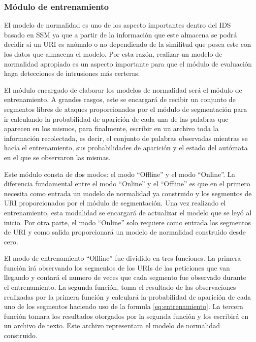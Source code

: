 \subsubsection{Módulo de entrenamiento}\label{sec:entrenamiento}

El modelo de normalidad es uno de los aspecto importantes dentro del IDS basado en SSM ya que a partir de la información que este almacena se podrá decidir si un URI es anómalo o no dependiendo de la similitud que posea este con los datos que almacena el modelo. Por esta razón, realizar un modelo de normalidad apropiado es un aspecto  importante para que el módulo de evaluación haga detecciones de intrusiones más certeras.

El módulo encargado de elaborar los modelos de normalidad será el módulo de entrenamiento. A grandes rasgos, este se encargará de recibir un conjunto de segmentos libres de ataques proporcionados por el módulo de segmentación para ir calculando la probabilidad de aparición de cada una de las palabras que aparecen en los mismos, para finalmente, escribir en un archivo toda la información recolectada, es decir, el conjunto de palabras observadas mientras se hacía el entrenamiento, sus probabilidades de aparición y el estado del autómata en el que se observaron las mismas.

Este módulo consta de dos modos: el modo ``Offline'' y el modo ``Online''. La  diferencia fundamental entre el modo ``Online'' y el ``Offline'' es que en el primero necesita como entrada un modelo de normalidad ya construido y los segmentos de URI proporcionados por el módulo de segmentación. Una vez realizado el entrenamiento, esta modalidad se encargará de actualizar el modelo que se leyó al inicio. Por otra parte, el modo ``Online'' solo requiere como entrada los segmentos de URI y como salida proporcionará un  modelo de normalidad construido desde cero.

El modo de entrenamiento ``Offline'' fue dividido en tres funciones. La primera función irá observando los segmentos de los URIs de las peticiones que van llegando y contará el numero de veces que cada segmento fue observado durante el entrenamiento. La segunda función, toma el resultado de las observaciones realizadas por la primera función y calculará la probabilidad de aparición de cada uno de los segmentos haciendo uso de la formula \ref{eq:entrenamiento}. La tercera función tomara los resultados otorgados por la segunda función y los escribirá en un archivo de texto. Este archivo representara el modelo de normalidad construido.

